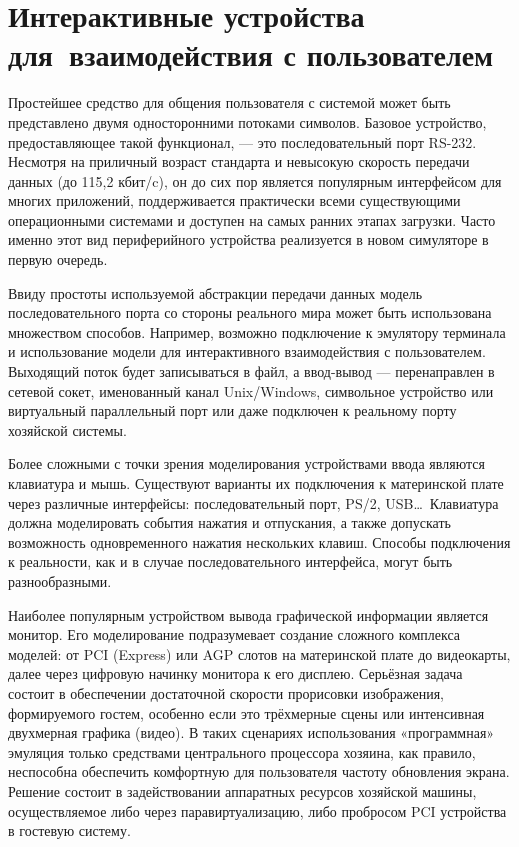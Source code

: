 \section[Интерактивные устройства]{Интерактивные устройства для~взаимодействия с пользователем}

Простейшее средство для общения пользователя с системой может быть представлено двумя односторонними потоками символов. Базовое устройство, предоставляющее такой функционал, — это последовательный порт RS-232. Несмотря на приличный возраст стандарта и невысокую скорость передачи данных (до 115,2 кбит/c), он до сих пор является популярным интерфейсом для многих приложений, поддерживается практически всеми существующими операционными системами и доступен на самых ранних этапах загрузки. Часто именно этот вид периферийного устройства реализуется в новом симуляторе в первую очередь. 

Ввиду простоты используемой абстракции передачи данных модель последовательного порта со стороны реального мира может быть использована множеством способов. Например, возможно подключение к эмулятору терминала и использование модели для интерактивного взаимодействия с пользователем. Выходящий поток  будет записываться в файл, а ввод-вывод — перенаправлен в сетевой сокет, именованный канал Unix/Windows, символьное  устройство или виртуальный параллельный порт или даже подключен к реальному порту хозяйской системы.

Более сложными с точки зрения моделирования устройствами ввода являются клавиатура и мышь. Существуют варианты их подключения к материнской плате через различные интерфейсы: последовательный порт, PS/2, USB\dots\ Клавиатура должна моделировать события нажатия и отпускания, а также допускать возможность одновременного нажатия нескольких клавиш. Способы подключения к реальности, как и в случае последовательного интерфейса, могут быть разнообразными.

Наиболее популярным устройством вывода графической информации является монитор. Его моделирование подразумевает создание сложного комплекса моделей: от PCI (Express) или AGP слотов на материнской плате до видеокарты, далее через цифровую начинку монитора к его дисплею. Серьёзная задача состоит в обеспечении достаточной скорости прорисовки изображения, формируемого гостем, особенно если это трёхмерные сцены или интенсивная двухмерная графика (видео). В таких сценариях использования «программная» эмуляция только средствами центрального процессора хозяина, как правило, неспособна обеспечить комфортную для пользователя частоту обновления экрана. Решение состоит в задействовании аппаратных ресурсов хозяйской машины, осуществляемое либо через паравиртуализацию, либо пробросом PCI устройства в гостевую систему.

